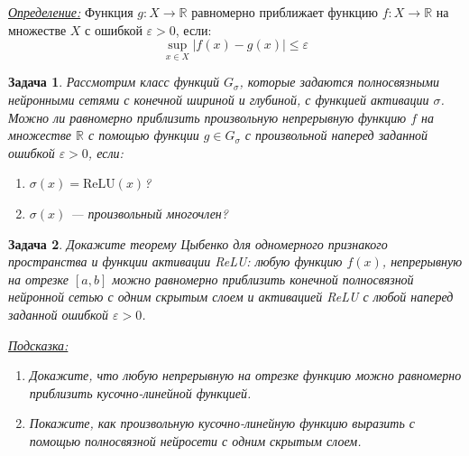 \documentclass[12pt,fleqn]{article}
\newtheorem{esProblem}{Задача}
\begin{document}
\vspace{0.5\baselineskip}
\noindent
\underline{\textit{Определение:}} Функция $g: X \to \mathbb{R}$ равномерно приближает функцию $f: X \to \mathbb{R}$ на множестве $X$ с ошибкой $\varepsilon > 0$, если:
$$
\sup_{x \in X} \Big|f(x) - g(x)\Big| \le \varepsilon
$$

\begin{esProblem}
    Рассмотрим класс функций $G_{\sigma}$, которые задаются полносвязными нейронными сетями с конечной шириной и глубиной, с функцией активации $\sigma$. Можно ли равномерно приблизить произвольную непрерывную функцию $f$ на множестве $\mathbb{R}$ с помощью функции $g \in G_{\sigma}$ с произвольной наперед заданной ошибкой $\varepsilon > 0$, если:
    \begin{enumerate}[label=(\alph*)]
        \item $\sigma(x) = \text{ReLU}(x)$?
        \item $\sigma(x)$ --- произвольный многочлен?
    \end{enumerate}

\end{esProblem}
\begin{esProblem}
    Докажите теорему Цыбенко для одномерного признакого пространства и функции активации ReLU: любую функцию $f(x)$, непрерывную на отрезке $[a, b]$ можно равномерно приблизить конечной полносвязной нейронной сетью с одним скрытым слоем и активацией ReLU с любой наперед заданной ошибкой $\varepsilon > 0$.

    \vspace{0.5\baselineskip}
    \noindent
    \underline{\textit{Подсказка:}}
    \begin{enumerate}[label=(\alph*)]
        \item Докажите, что любую непрерывную на отрезке функцию можно равномерно приблизить кусочно-линейной функцией.
        \item Покажите, как произвольную кусочно-линейную функцию выразить с помощью полносвязной нейросети с одним скрытым слоем. 
    \end{enumerate}
\end{esProblem}
\end{document}
